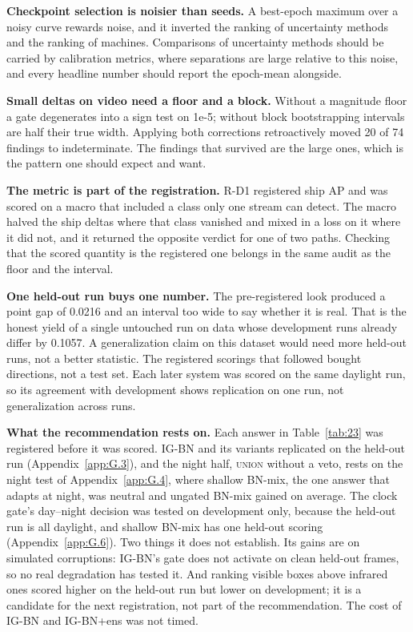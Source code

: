 \documentclass[10pt]{article}
\begin{document}
\textbf{Checkpoint selection is noisier than seeds.} A best-epoch maximum over a noisy curve rewards noise, and it inverted the ranking of uncertainty methods and the ranking of machines. Comparisons of uncertainty methods should be carried by calibration metrics, where separations are large relative to this noise, and every headline number should report the epoch-mean alongside.

\textbf{Small deltas on video need a floor and a block.} Without a magnitude floor a gate degenerates into a sign test on 1e-5; without block bootstrapping intervals are half their true width. Applying both corrections retroactively moved 20 of 74 findings to indeterminate. The findings that survived are the large ones, which is the pattern one should expect and want.

\textbf{The metric is part of the registration.} R-D1 registered ship AP and was scored on a macro that included a class only one stream can detect. The macro halved the ship deltas where that class vanished and mixed in a loss on it where it did not, and it returned the opposite verdict for one of two paths. Checking that the scored quantity is the registered one belongs in the same audit as the floor and the interval.

\textbf{One held-out run buys one number.} The pre-registered look produced a point gap of 0.0216 and an interval too wide to say whether it is real. That is the honest yield of a single untouched run on data whose development runs already differ by 0.1057. A generalization claim on this dataset would need more held-out runs, not a better statistic. The registered scorings that followed bought directions, not a test set. Each later system was scored on the same daylight run, so its agreement with development shows replication on one run, not generalization across runs.

\textbf{What the recommendation rests on.} Each answer in Table~\ref{tab:23} was registered before it was scored. IG-BN and its variants replicated on the held-out run (Appendix~\ref{app:G.3}), and the night half, \textsc{union} without a veto, rests on the night test of Appendix~\ref{app:G.4}, where shallow BN-mix, the one answer that adapts at night, was neutral and ungated BN-mix gained on average. The clock gate's day--night decision was tested on development only, because the held-out run is all daylight, and shallow BN-mix has one held-out scoring (Appendix~\ref{app:G.6}). Two things it does not establish. Its gains are on simulated corruptions: IG-BN's gate does not activate on clean held-out frames, so no real degradation has tested it. And ranking visible boxes above infrared ones scored higher on the held-out run but lower on development; it is a candidate for the next registration, not part of the recommendation. The cost of IG-BN and IG-BN+ens was not timed.
\end{document}

